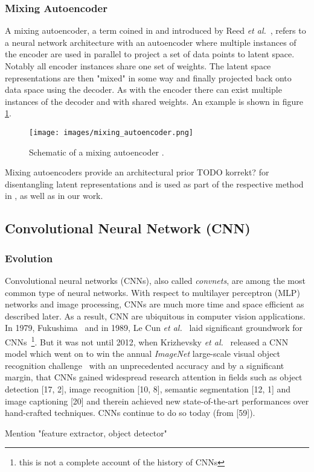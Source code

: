\documentclass[12pt,a4paper]{article}
\begin{document}
\subsubsection{Mixing Autoencoder}\label{subsec:mixAE}
A mixing autoencoder, a term coined in \cite{DisentFacOfVarByMixTh} and introduced by Reed \textit{et al.}~\cite{DeepVisAnaMak}, refers to a neural network architecture with an autoencoder where multiple instances of the encoder are used in parallel to project a set of data points to latent space. Notably all encoder instances share one set of weights. The latent space representations are then "mixed" in some way and finally projected back onto data space using the decoder. As with the encoder there can exist multiple instances of the decoder and with shared weights. An example is shown in figure \ref{fig:mixing_autoencoder}. 
\begin{figure}[ht]
\centering
\texttt{[image: images/mixing\_autoencoder.png]}
\caption{Schematic of a mixing autoencoder \cite{DisentFacOfVarByMixTh}.}
\label{fig:mixing_autoencoder}
\end{figure}
Mixing autoencoders provide an architectural prior TODO korrekt? for disentangling latent representations and is used as part of the respective method in \cite{DeepVisAnaMak}, \cite{DisentFacOfVarByMixTh} as well as in our work.


\subsection{Convolutional Neural Network (CNN)}
\subsubsection{Evolution}
Convolutional neural networks (CNNs), also called \textit{convnets}, are among the most common type of neural networks. With respect to multilayer perceptron (MLP) networks and image processing, CNNs are much more time and space efficient as described later. As a result, CNN are ubiquitous in computer vision applications. In 1979, Fukushima~\cite{FukushimaCnn79} and in 1989, Le Cun \textit{et al.}~\cite{CunGrounworkCNNs} laid significant groundwork for CNNs~\footnote{this is not a complete account of the history of CNNs}. But it was not until 2012, when Krizhevsky \textit{et al.}~\cite{AlexNet} released a CNN model which went on to win the annual \textit{ImageNet} large-scale visual object recognition challenge~\cite{Imagenet} with an unprecedented accuracy and by a significant margin, that CNNs gained widespread research attention in fields such as object detection [17, 2], image recognition [10, 8], semantic segmentation [12, 1] and image captioning [20] and therein achieved new state-of-the-art performances over hand-crafted techniques. CNNs continue to do so today (from [59]).
\par [62] Mention "feature extractor, object detector"
\end{document}
